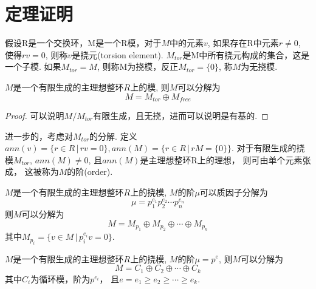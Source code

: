 \section{定理证明}
\begin{definition}
	假设R是一个交换环，M是一个R模，对于$M$中的元素$v$, 如果存在R中元素$r \ne 0$,
	使得$rv = 0$, 则称$v$是挠元(torsion element). 
	$M_{tor}$是M中所有挠元构成的集合，这是一个子模.
	如果$M_{tor} = M$, 则称M为挠模，反正$M_{tor}=\{0\}$, 称$M$为无挠模.
\end{definition}

\begin{theorem}
	$M$是一个有限生成的主理想整环$R$上的模, 则$M$可以分解为
	\begin{equation}
	M = M_{tor} \oplus M_{free}
	\label{equ:decom_1}
	\end{equation}
\end{theorem}
\begin{proof}
	可以说明$M/M_{tor}$有限生成，且无挠，进而可以说明是有基的.
\end{proof}

进一步的，考虑对$M_{tor}$的分解.
定义$ann(v) = \{r\in R\,|\, rv = 0\}, 
ann(M) = \{r\in R \,|\, rM = \{0\}\}$.
对于有限生成的挠模$M_{tor}$, $ann(M) \ne 0$,
且$ann(M)$是主理想整环R上的理想， 则可由单个元素张成，
这被称为$M$的阶(order).

\begin{theorem}
	$M$是一个有限生成的主理想整环$R$上的挠模, $M$的阶$\mu$可以质因子分解为
	$$\mu = p_1^{e_1}p_2^{e_2}\cdots p_n^{e_n}$$
	则$M$可以分解为
	\begin{equation}
	M = M_{p_1} \oplus M_{p_2} \oplus \cdots \oplus M_{p_n}
	\label{equ:decom_2}
	\end{equation}
	其中$M_{p_i} = \{v\in M\, |\, p_i^{e_i} v = 0\}$.
\end{theorem}

\begin{theorem}
	$M$是一个有限生成的主理想整环$R$上的挠模, $M$的阶$\mu = p^e$,
	则$M$可以分解为
	\begin{equation}
	M = C_1 \oplus C_2 \oplus \cdots \oplus C_k
	\label{equ:decom_3}
	\end{equation}
	其中$C_i$为循环模，阶为$p^{e_i}$， 且$e = e_1 \ge e_2 \ge \cdots \ge e_k$.
\end{theorem}

